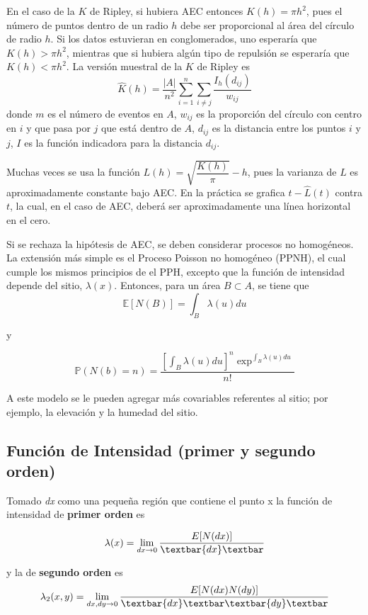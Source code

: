 \documentclass[12,]{article}
\begin{document}
En el caso de la $K$ de Ripley, si hubiera AEC entonces
$K(h) = \pi h^2$, pues el número de puntos dentro de un radio $h$ debe
ser proporcional al área del círculo de radio $h$. Si los datos
estuvieran en conglomerados, uno esperaría que $K(h) > \pi h^2$,
mientras que si hubiera algún tipo de repulsión se esperaría que
$K(h) < \pi h^2$. La versión muestral de la $K$ de Ripley es \[
\hat{K}(h) = \dfrac{\vert A \vert}{n^2} \sum\limits_{i=1}^{n} \sum\limits_{i \neq j}^{} \dfrac{I_h(d_{ij})}{w_{ij}}
\] donde $m$ es el número de eventos en $A$, $w_{ij}$ es la proporción
del círculo con centro en $i$ y que pasa por $j$ que está dentro de $A$,
$d_{ij}$ es la distancia entre los puntos $i$ y $j$, $I$ es la función
indicadora para la distancia $d_{ij}$.

Muchas veces se usa la función $L(h) = \sqrt{\dfrac{K(h)}{\pi}} - h$,
pues la varianza de $L$ es aproximadamente constante bajo AEC. En la
práctica se grafica $t - \hat{L}(t)$ contra $t$, la cual, en el caso de
AEC, deberá ser aproximadamente una línea horizontal en el cero.

Si se rechaza la hipótesis de AEC, se deben considerar procesos no
homogéneos. La extensión más simple es el Proceso Poisson no homogéneo
(PPNH), el cual cumple los mismos principios de el PPH, excepto que la
función de intensidad depende del sitio, $\lambda(x)$. Entonces, para un
área $B \subset A$, se tiene que \[
\mathbb{E}[N(B)] = \int_{B} \lambda(u) du
\]

y

\[
\mathbb{P}(N(b) = n) = \dfrac{[\int_{B} \lambda(u) du]^n \exp^{\int_{B} \lambda(u) du}}{n!}
\]

A este modelo se le pueden agregar más covariables referentes al sitio;
por ejemplo, la elevación y la humedad del sitio.

\subsection{Función de Intensidad (primer y segundo
orden)}\label{funcion-de-intensidad-primer-y-segundo-orden}

Tomado \emph{dx} como una pequeña región que contiene el punto x la
función de intensidad de \textbf{primer orden} es

\[
\lambda(x) = \displaystyle\lim_{dx \rightarrow 0} \dfrac{E[N(dx)]} {\textbar{dx}\textbar}
\]

y la de \textbf{segundo orden} es \[
\lambda_2(x,y) = \displaystyle\lim_{dx, dy \rightarrow 0} \dfrac{E[N(dx)N(dy)]} {\textbar{dx}\textbar \textbar{dy}\textbar}
\]
\end{document}
